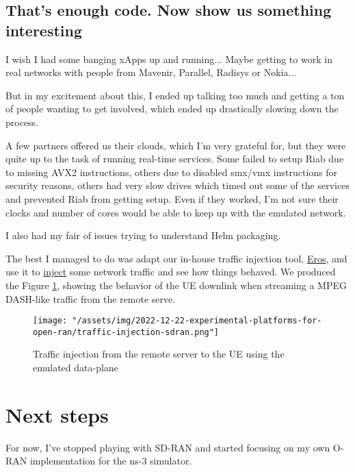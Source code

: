 \documentclass{article}
\begin{document}
    \subsection{That's enough code. Now show us something interesting}
        I wish I had some banging xApps up and running... Maybe getting to work in real
        networks with people from Mavenir, Parallel, Radisys or Nokia...

        But in my excitement about this, I ended up talking too much and getting a ton
        of people wanting to get involved, which ended up drastically slowing down the process.

        A few partners offered us their clouds, which I'm very grateful for, but they were quite
        up to the task of running real-time services. Some failed to setup Riab due to missing AVX2
        instructions, others due to disabled smx/vmx instructions for security reasons, others
        had very slow drives which timed out some of the services and prevented Riab from getting
        setup. Even if they worked, I'm not sure their clocks and number of cores would be able to keep up
        with the emulated network.

        I also had my fair of issues trying to understand Helm packaging.

        The best I managed to do was adapt our in-house traffic injection tool,
        \href{https://github.com/notopoloko/Eros}{Eros}, and use it
        to  \href{https://github.com/Gabrielcarvfer/sdran-in-a-box/blob/work/inject_eros_traffic.py}{inject}
        some network traffic and see how things behaved. We produced the Figure \ref{fig:traffic-injection},
        showing the behavior of the UE downlink when streaming a MPEG DASH-like traffic from the remote serve.

        \begin{figure}
            \texttt{[image: "/assets/img/2022-12-22-experimental-platforms-for-open-ran/traffic-injection-sdran.png"]}
            \caption{Traffic injection from the remote server to the UE using the emulated data-plane}
            \label{fig:traffic-injection}
        \end{figure}


\section{Next steps}
    For now, I've stopped playing with SD-RAN and started focusing on my own O-RAN implementation
    for the ns-3 simulator.
\end{document}
